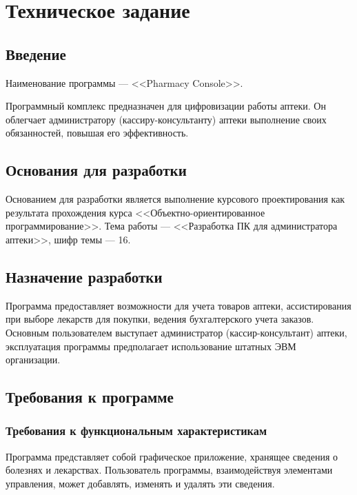 \section{Техническое задание}



\subsection{Введение}


Наименование программы --- <<Pharmacy Console>>.

Программный комплекс предназначен для цифровизации работы аптеки. Он облегчает
администратору (кассиру-консультанту) аптеки выполнение своих обязанностей,
повышая его эффективность.


\subsection{Основания для разработки}


Основанием для разработки является выполнение курсового проектирования как
результата прохождения курса <<Объектно-ориентированное программирование>>.
Тема работы --- <<Разработка ПК для администратора аптеки>>, шифр темы --- 16.


\subsection{Назначение разработки}


Программа предоставляет возможности для учета товаров аптеки, ассистирования
при выборе лекарств для покупки, ведения бухгалтерского учета заказов. Основным
пользователем выступает администратор (кассир-консультант) аптеки, эксплуатация
программы предполагает использование штатных ЭВМ организации.


\subsection{Требования к программе}


\subsubsection{Требования к функциональным характеристикам}

Программа представляет собой графическое приложение, хранящее сведения о
болезнях и лекарствах. Пользователь программы, взаимодействуя элементами
управления, может добавлять, изменять и удалять эти сведения.

